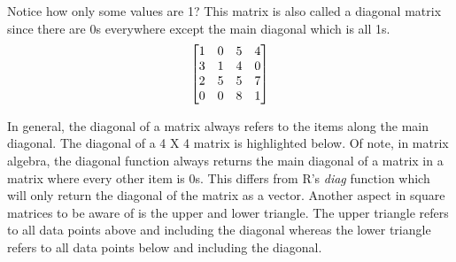 \documentclass[a4paper]{article}
\newcommand{\tikzmark}[2]{
    \tikz[overlay,remember picture,baseline] 
    \node[anchor=base] (#1) {$#2$};
}
\begin{document}
    Notice how only some values are 1? This matrix is also called a diagonal matrix since there are 0s everywhere except the main diagonal which is all 1s. 
     \begin{equation}
        \begin{bmatrix}
          \tikzmark{top}{1} & 0 & 5	& 4 \\
             3 & 1 & 4 & 0\\
             2 & 5 & 5 & 7 \\
             0 & 0 & 8 & \tikzmark{bottom}{1}
        \end{bmatrix}
      \end{equation}


    In general, the diagonal of a matrix always refers to the items along the main diagonal. The diagonal of a 4 X 4 matrix is highlighted below. Of note, in matrix algebra, the diagonal function always returns the main diagonal of a matrix in a matrix where every other item is 0s. This differs from R's \textit{diag} function which will only return the diagonal of the matrix as a vector. Another aspect in square matrices to be aware of is the upper and lower triangle. The upper triangle refers to all data points above and including the diagonal whereas the lower triangle refers to all data points below and including the diagonal.
 
\end{document}
